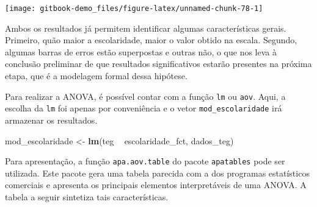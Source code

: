 \documentclass[
]{book}
\newenvironment{Shaded}{\begin{snugshade}}{\end{snugshade}}
\newcommand{\KeywordTok}[1]{\textcolor[rgb]{0.13,0.29,0.53}{\textbf{#1}}}
\newcommand{\NormalTok}[1]{#1}
\newcommand{\OperatorTok}[1]{\textcolor[rgb]{0.81,0.36,0.00}{\textbf{#1}}}
\newcommand{\StringTok}[1]{\textcolor[rgb]{0.31,0.60,0.02}{#1}}
\begin{document}
\begin{center}\texttt{[image: gitbook-demo\_files/figure-latex/unnamed-chunk-78-1]} \end{center}

Ambos os resultados já permitem identificar algumas características gerais. Primeiro, quão maior a escolaridade, maior o valor obtido na escala. Segundo, algumas barras de erros estão superpostas e outras não, o que nos leva à conclusão preliminar de que resultados significativos estarão presentes na próxima etapa, que é a modelagem formal dessa hipótese.

Para realizar a ANOVA, é possível contar com a função \texttt{lm} ou \texttt{aov}. Aqui, a escolha da \texttt{lm} foi apenas por conveniência e o vetor \texttt{mod\_escolaridade} irá armazenar os resultados.

\begin{Shaded}
\begin{Highlighting}[]
\NormalTok{mod_escolaridade <-}\StringTok{ }\KeywordTok{lm}\NormalTok{(teg }\OperatorTok{~}\StringTok{ }\NormalTok{escolaridade_fct, dados_teg)}
\end{Highlighting}
\end{Shaded}

Para apresentação, a função \texttt{apa.aov.table} do pacote \texttt{apatables} pode ser utilizada. Este pacote gera uma tabela parecida com a dos programas estatísticos comerciais e apresenta os principais elementos interpretáveis de uma ANOVA. A tabela a seguir sintetiza tais características.
\end{document}
